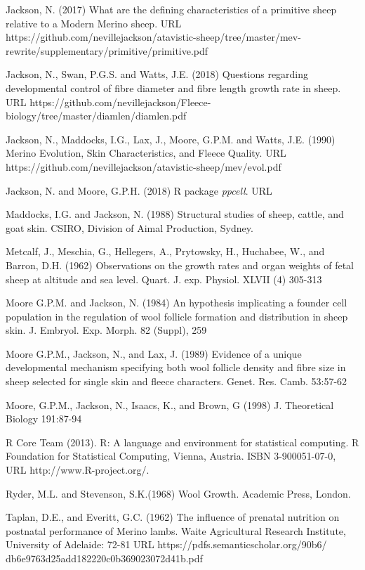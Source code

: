 \documentclass[titlepage]{article}  %
\begin{document}
\begin{thebibliography}{99}
Jackson, N. (2017) What are the defining characteristics of a primitive sheep relative to a Modern Merino sheep.  URL https://github.com/nevillejackson/atavistic-sheep/tree/master/mev-rewrite/supplementary/primitive/primitive.pdf

Jackson, N., Swan, P.G.S. and Watts, J.E. (2018) Questions regarding developmental control of fibre diameter and fibre length growth rate in sheep. URL https://github.com/nevillejackson/Fleece-biology/tree/master/diamlen/diamlen.pdf

Jackson, N., Maddocks, I.G., Lax, J., Moore, G.P.M. and Watts, J.E. (1990) Merino Evolution, Skin Characteristics, and Fleece Quality. URL https://github.com/nevillejackson/atavistic-sheep/mev/evol.pdf 

Jackson, N. and Moore, G.P.H. (2018) R package {\em ppcell}. URL

Maddocks, I.G. and Jackson, N. (1988) Structural studies of sheep, cattle, and goat skin. CSIRO, Division of Aimal Production, Sydney.

Metcalf, J., Meschia, G., Hellegers, A., Prytowsky, H., Huchabee, W., and Barron, D.H. (1962) Observations on the growth rates and organ weights of fetal sheep at altitude and sea level. Quart. J. exp. Physiol. XLVII (4) 305-313

Moore G.P.M. and Jackson, N. (1984) An hypothesis implicating a founder cell population in the regulation of wool follicle formation and distribution in sheep skin. J. Embryol. Exp. Morph. 82 (Suppl), 259

Moore G.P.M., Jackson, N., and Lax, J. (1989) Evidence of a unique developmental mechanism specifying both wool follicle density and fibre size in sheep selected for single skin and fleece characters. Genet. Res. Camb. 53:57-62

Moore, G.P.M., Jackson, N., Isaacs, K., and Brown, G (1998) J. Theoretical Biology 191:87-94

R Core Team (2013). R: A language and environment for statistical
  computing. R Foundation for Statistical Computing, Vienna, Austria.
  ISBN 3-900051-07-0, URL http://www.R-project.org/.

Ryder, M.L. and Stevenson, S.K.(1968) Wool Growth. Academic Press, London.

Taplan, D.E., and Everitt, G.C. (1962) The influence of prenatal nutrition on postnatal performance of Merino lambs. Waite Agricultural Research Institute, University of Adelaide: 72-81
URL https://pdfs.semanticscholar.org/90b6/
db6e9763d25add182220c0b369023072d41b.pdf


\end{thebibliography}
\end{document}
